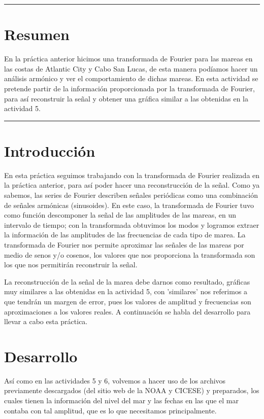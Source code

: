 \documentclass[12pt]{article}
\begin{document}
\begin{doublespace}
\hrule
\section*{Resumen}
En la práctica anterior hicimos una transformada de Fourier para las mareas en las costas de Atlantic City y Cabo San Lucas, de esta manera podíamos hacer un análisis armónico y ver el comportamiento de dichas mareas. En esta actividad se pretende partir de la información proporcionada por la transformada de Fourier, para así reconstruir la señal y obtener una gráfica similar a las obtenidas en la actividad 5.
\vspace{0.6 cm}
\hrule

\vspace{0.6 cm}

\section{Introducción}

En esta práctica seguimos trabajando con la transformada de Fourier realizada en la práctica anterior, para así poder hacer una reconstrucción de la señal. Como ya sabemos, las series de Fourier describen señales periódicas como una combinación de señales armónicas (sinusoides). En este caso, la transformada de Fourier tuvo como función descomponer la señal de las amplitudes de las mareas, en un intervalo de tiempo; con la transformada obtuvimos los modos y logramos extraer la información de las amplitudes de las frecuencias de cada tipo de marea. La transformada de Fourier nos permite aproximar las señales de las mareas por medio de senos y/o cosenos, los valores que nos proporciona la transformada son los que nos permitirán reconstruir la señal.

La reconstrucción de la señal de la marea debe darnos como resultado, gráficas muy similares a las obtenidas en la actividad 5, con 'similares' nos referimos a que tendrán un margen de error, pues los valores de amplitud y frecuencias son aproximaciones a los valores reales. A continuación se habla del desarrollo para llevar a cabo esta práctica.

\section{Desarrollo}
Así como en las actividades 5 y 6, volvemos a hacer uso de los archivos previamente descargados (del sitio web de la NOAA y CICESE) y preparados, los cuales tienen la información del nivel del mar y las fechas en las que el mar contaba con tal amplitud, que es lo que necesitamos principalmente.


\end{doublespace}
\end{document}
